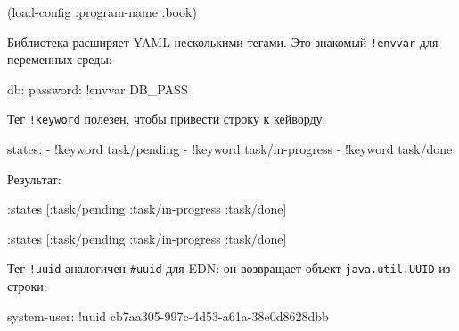 \begin{english}
  \begin{clojure}
(load-config {:program-name :book})
  \end{clojure}
\end{english}

Библиотека расширяет YAML несколькими тегами. Это знакомый \verb|!envvar|
для переменных среды:


\begin{english}
  \begin{yaml}
db:
  password: !envvar DB_PASS
  \end{yaml}
\end{english}

\noindent
Тег \verb|!keyword| полезен, чтобы привести строку к кейворду:

\begin{english}
  \begin{yaml}
states:
  - !keyword task/pending
  - !keyword task/in-progress
  - !keyword task/done
  \end{yaml}
\end{english}

\noindent
Результат:

\ifx\devicetype\mobile

\begin{english}
  \begin{clojure}
{:states [:task/pending
          :task/in-progress
          :task/done]}
  \end{clojure}
\end{english}

\else

\begin{english}
  \begin{clojure}
{:states [:task/pending :task/in-progress :task/done]}
  \end{clojure}
\end{english}

\fi

Тег \verb|!uuid| аналогичен \verb|#uuid| для EDN: он возвращает объект
\verb|java.util.UUID| из строки:

\ifx\devicetype\mobile

\begin{english}
  \begin{yaml}
system-user: !uuid
    cb7aa305-997c-4d53-a61a-38e0d8628dbb
  \end{yaml}
\end{english}

